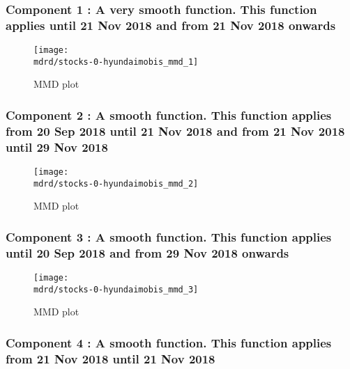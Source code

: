 \documentclass{article} %
\begin{document}
\subsubsection{Component 1 : A very smooth function. This function applies until 21 Nov 2018 and from 21 Nov 2018 onwards}

\begin{figure}[H]
\newcommand{\wmgd}{0.5\columnwidth}
\newcommand{\hmgd}{3.0cm}
\newcommand{\mdrd}{stocks-0-hyundaimobis}
\newcommand{\mbm}{\hspace{-0.3cm}}
\texttt{[image: \\mdrd/stocks-0-hyundaimobis\_mmd\_1]}
\caption{
MMD plot}
\label{fig:mmd1}
\end{figure}

\subsubsection{Component 2 : A smooth function. This function applies from 20 Sep 2018 until 21 Nov 2018 and from 21 Nov 2018 until 29 Nov 2018}

\begin{figure}[H]
\newcommand{\wmgd}{0.5\columnwidth}
\newcommand{\hmgd}{3.0cm}
\newcommand{\mdrd}{stocks-0-hyundaimobis}
\newcommand{\mbm}{\hspace{-0.3cm}}
\texttt{[image: \\mdrd/stocks-0-hyundaimobis\_mmd\_2]}
\caption{
MMD plot}
\label{fig:mmd2}
\end{figure}

\subsubsection{Component 3 : A smooth function. This function applies until 20 Sep 2018 and from 29 Nov 2018 onwards}

\begin{figure}[H]
\newcommand{\wmgd}{0.5\columnwidth}
\newcommand{\hmgd}{3.0cm}
\newcommand{\mdrd}{stocks-0-hyundaimobis}
\newcommand{\mbm}{\hspace{-0.3cm}}
\texttt{[image: \\mdrd/stocks-0-hyundaimobis\_mmd\_3]}
\caption{
MMD plot}
\label{fig:mmd3}
\end{figure}

\subsubsection{Component 4 : A smooth function. This function applies from 21 Nov 2018 until 21 Nov 2018}
\end{document}
